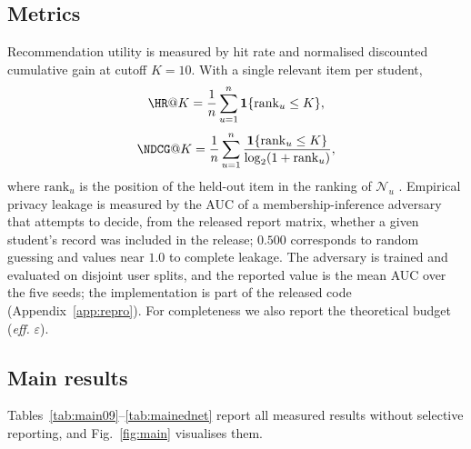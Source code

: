 \documentclass[pdflatex,sn-basic,Numbered]{sn-jnl}
\theoremstyle{plain}
\theoremstyle{remark}
\theoremstyle{definition}
\newcommand{\eps}{\varepsilon}
\begin{document}
\subsection{Metrics}\label{sec:metrics}

Recommendation utility is measured by hit rate and normalised discounted cumulative gain at cutoff $K=10$. With a single relevant item per student,
\begin{equation}\label{eq:hr}
\HR@K=\frac{1}{n}\sum_{u=1}^{n}\mathbf 1\{\mathrm{rank}_u\le K\},
\end{equation}
\begin{equation}\label{eq:ndcg}
\NDCG@K=\frac{1}{n}\sum_{u=1}^{n}\frac{\mathbf 1\{\mathrm{rank}_u\le K\}}{\log_2(1+\mathrm{rank}_u)},
\end{equation}
where $\mathrm{rank}_u$ is the position of the held-out item in the ranking of $\mathcal{N}_u$ \cite{jarvelin2002cg}. Empirical privacy leakage is measured by the AUC of a membership-inference adversary that attempts to decide, from the released report matrix, whether a given student's record was included in the release; $0.500$ corresponds to random guessing and values near $1.0$ to complete leakage. The adversary is trained and evaluated on disjoint user splits, and the reported value is the mean AUC over the five seeds; the implementation is part of the released code (Appendix~\ref{app:repro}). For completeness we also report the theoretical budget (\emph{eff.} $\eps$).

\subsection{Main results}\label{sec:main}

Tables~\ref{tab:main09}--\ref{tab:mainednet} report all measured results without selective reporting, and Fig.~\ref{fig:main} visualises them.
\end{document}
